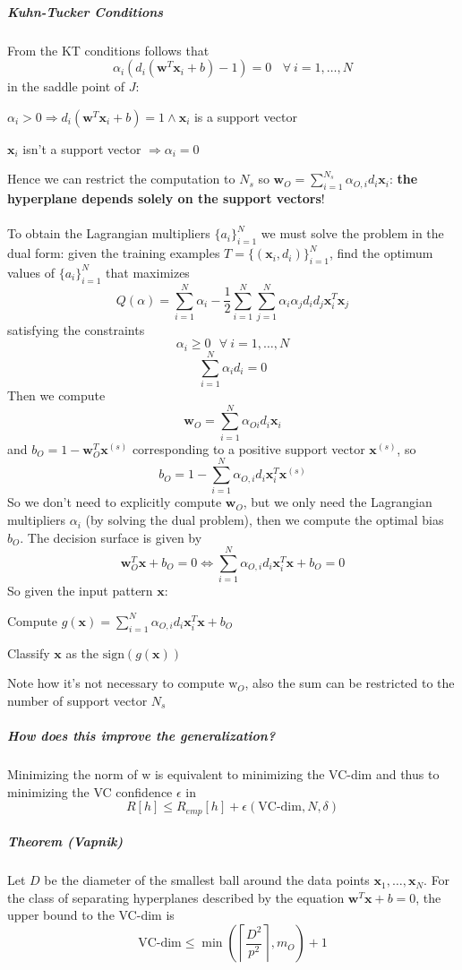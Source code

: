 \documentclass[10pt]{report}
\begin{document}
\subparagraph{Kuhn-Tucker Conditions} From the KT conditions follows that $$\alpha_i(d_i(\mathbf{w}^T\mathbf{x}_i + b) - 1) = 0\:\:\:\:\forall\:i=1,\ldots, N$$ in the saddle point of $J$:
\begin{list}{}{}
	\item $\alpha_i > 0 \Rightarrow d_i(\mathbf{w}^T\mathbf{x}_i+b) = 1\wedge\mathbf{x}_i$ is a support vector
	\item $\mathbf{x}_i$ isn't a support vector $\Rightarrow \alpha_i = 0$
\end{list}
Hence we can restrict the computation to $N_s$ so $\mathbf{w}_O=\sum_{i=1}^{N_s} \alpha_{O,i}d_i\mathbf{x}_i$: \textbf{the hyperplane depends solely on the support vectors}!\\\\
To obtain the Lagrangian multipliers $\{a_i\}_{i=1}^N$ we must solve the problem in the dual form: given the training examples $T = \{(\mathbf{x}_i, d_i)\}_{i=1}^N$, find the optimum values of $\{a_i\}_{i=1}^N$ that maximizes $$Q(\alpha) = \sum_{i=1}^N \alpha_i - \frac{1}{2}\sum_{i=1}^N\sum_{j=1}^N\alpha_i\alpha_jd_id_j\mathbf{x}_i^T\mathbf{x}_j$$ satisfying the constraints $$\alpha_i\geq 0\:\:\:\forall\:i=1,\ldots,N$$ $$\sum_{i=1}^N\alpha_id_i = 0$$
Then we compute $$\mathbf{w}_O = \sum_{i=1}^N\alpha_{Oi}d_i\mathbf{x}_i$$ and $b_O = 1-\mathbf{w}_O^T\mathbf{x}^{(s)}$ corresponding to a positive support vector $\mathbf{x}^{(s)}$, so $$b_O = 1-\sum_{i=1}^N\alpha_{O,i}d_i\mathbf{x}_i^T\mathbf{x}^{(s)}$$
So we don't need to explicitly compute $\mathbf{w}_O$, but we only need the Lagrangian multipliers $\alpha_i$ (by solving the dual problem), then we compute the optimal bias $b_O$. The decision surface is given by $$\mathbf{w}_O^T\mathbf{x} + b_O = 0 \Leftrightarrow\sum_{i=1}^N\alpha_{O,i}d_i \mathbf{x}_i^T\mathbf{x} + b_O = 0$$
So given the input pattern $\mathbf{x}$:
\begin{list}{}{}
	\item Compute $g(\mathbf{x}) = \sum_{i=1}^N \alpha_{O,i}d_i\mathbf{x}_i^T\mathbf{x} + b_O$
	\item Classify $\mathbf{x}$ as the $\text{sign}(g(\mathbf{x}))$
\end{list}
Note how it's not necessary to compute $\text{w}_O$, also the sum can be restricted to the number of support vector $N_s$
\subparagraph{How does this improve the generalization?} Minimizing the norm of $\text{w}$ is equivalent to minimizing the VC-dim and thus to minimizing the VC confidence $\epsilon$ in $$R[h] \leq R_{emp}[h] + \epsilon(\text{VC-dim}, N, \delta)$$
\subparagraph{Theorem (Vapnik)} Let $D$ be the diameter of the smallest ball around the data points $\mathbf{x}_1,\ldots,\mathbf{x}_N$. For the class of separating hyperplanes described by the equation $\mathbf{w}^T\mathbf{x}+b = 0$, the upper bound to the VC-dim is $$\text{VC-dim} \leq \min\left(\left\lceil\frac{D^2}{p^2}\right\rceil, m_O\right) + 1$$
\end{document}
